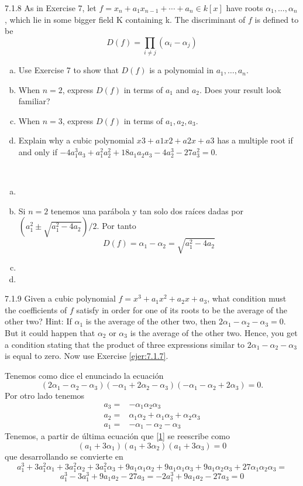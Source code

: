\documentclass[twoside]{article}
\begin{document}
\begin{ejercicio}{7.1.8}
As in Exercise 7, let $f = x_n +a_1x_{n−1} +\cdots + a_n ∈ k[x]$ have roots $α_1, \dotsc , α_n$, which lie
in some bigger field K containing k. The discriminant of $f$ is defined to be
$$
D( f) = \prod_{i\neq j}(\alpha_i - \alpha_j)
$$
\begin{enumerate}[a.]
\item Use Exercise 7 to show that $D( f )$ is a polynomial in $a_1, \dotsc, a_n$.
\item When $n = 2$, express $D( f )$ in terms of $a_1$ and $a_2$. Does your result look familiar?
\item  When $n = 3$, express $D( f )$ in terms of $a_1, a_2, a_3$.
\item Explain why a cubic polynomial $x3 +a1x2 +a2x+a3$ has a multiple root if and only if $−4a^3_1a_3 + a^2_1a^2_2+ 18a_1a_2a_3 - 4a^3_2 - 27a^2_3= 0.$
\end{enumerate}
\end{ejercicio}

\begin{solucion}\
\begin{enumerate}[a.]
\item 
\item Si $n=2$ tenemos una parábola y tan solo dos raíces dadas por $(a_1^2\pm\sqrt{a_1^2-4a_2})/2$. Por tanto
$$
D(f)=\alpha_1 - \alpha_2 = \sqrt{a_1^2-4a_2}
$$
\item 
\item 
\end{enumerate}
\end{solucion}

\newpage
\begin{ejercicio}{7.1.9}
Given a cubic polynomial $f = x^3+a_1x^2+a_2x+a_3$, what condition must the coefficients
of $f$ satisfy in order for one of its roots to be the average of the other two? Hint: If $α_1$ is
the average of the other two, then $2α_1 − α_2 − α_3 = 0$. But it could happen that $α_2$ or
$α_3$ is the average of the other two. Hence, you get a condition stating that the product of
three expressions similar to $2α_1 − α_2 − α_3$ is equal to zero. Now use Exercise \ref{ejer:7.1.7}.
\end{ejercicio}
\begin{solucion}
Tenemos como dice el enunciado la ecuación
\begin{equation}\label{1}
(2α_1 − α_2 − α_3)(-α_1 + 2α_2 − α_3)(-α_1 − α_2 + 2α_3)=0.
\end{equation}
Por otro lado tenemos
\begin{align*}
a_3=&-\alpha_1\alpha_2\alpha_3\\
a_2= & \alpha_1\alpha_2+\alpha_1\alpha_3+\alpha_2\alpha_3\\
a_1=&-\alpha_1-\alpha_2-\alpha_3
\end{align*}
Tenemos, a partir de última ecuación que \ref{1} se reescribe como
\[
(a_1+3\alpha_1)(a_1+3\alpha_2)(a_1+3\alpha_3)=0
\]
que desarrollando se convierte en
\[
a_1^3 + 3a_1^2\alpha_1 + 3a_1^2\alpha_2 + 3a_1^2\alpha_3 + 9a_1\alpha_1\alpha_2+ 9a_1\alpha_1\alpha_3 + 9a_1\alpha_2\alpha_3 + 27\alpha_1\alpha_2\alpha_3=
\]
\[
a_1^3-3a_1^3+9a_1a_2-27a_3=-2a_1^3+9a_1a_2-27a_3=0
\]
\end{solucion}
\newpage
\end{document}

